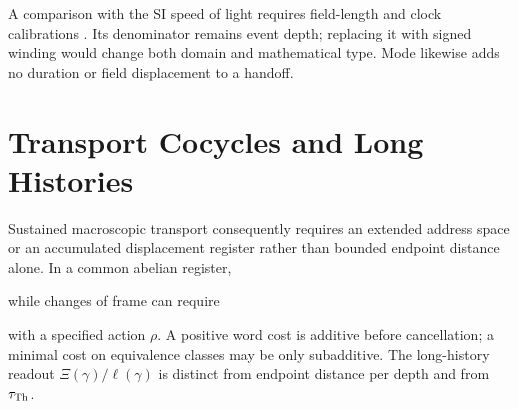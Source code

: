 A comparison with the SI speed of light requires field-length and clock calibrations \citep{bipm}. Its denominator remains event depth; replacing it with signed winding would change both domain and mathematical type. Mode likewise adds no duration or field displacement to a handoff.



\section{Transport Cocycles and Long Histories}\label{sec:cocycles}

Sustained macroscopic transport consequently requires an extended address space or an accumulated displacement register rather than bounded endpoint distance alone. In a common abelian register,

while changes of frame can require

with a specified action $\rho$. A positive word cost is additive before cancellation; a minimal cost on equivalence classes may be only subadditive. The long-history readout $\Xi(\gamma)/\ell(\gamma)$ is distinct from endpoint distance per depth and from $\tau_{\mathrm{Th}}$.
